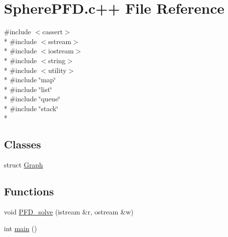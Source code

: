 \hypertarget{SpherePFD_8c_09_09}{\section{Sphere\+P\+F\+D.\+c++ File Reference}
\label{SpherePFD_8c_09_09}
}
{\ttfamily \#include $<$cassert$>$}\\*
{\ttfamily \#include $<$sstream$>$}\\*
{\ttfamily \#include $<$iostream$>$}\\*
{\ttfamily \#include $<$string$>$}\\*
{\ttfamily \#include $<$utility$>$}\\*
{\ttfamily \#include \char`\"{}map\char`\"{}}\\*
{\ttfamily \#include \char`\"{}list\char`\"{}}\\*
{\ttfamily \#include \char`\"{}queue\char`\"{}}\\*
{\ttfamily \#include \char`\"{}stack\char`\"{}}\\*
\subsection*{Classes}
\begin{DoxyCompactItemize}
\item 
struct \hyperlink{structGraph}{Graph}
\end{DoxyCompactItemize}
\subsection*{Functions}
\begin{DoxyCompactItemize}
\item 
void \hyperlink{SpherePFD_8c_09_09_ad1fb4f8285d98373eb99cc90453aa1df}{P\+F\+D\+\_\+solve} (istream \&r, ostream \&w)
\item 
int \hyperlink{SpherePFD_8c_09_09_ae66f6b31b5ad750f1fe042a706a4e3d4}{main} ()
\end{DoxyCompactItemize}



